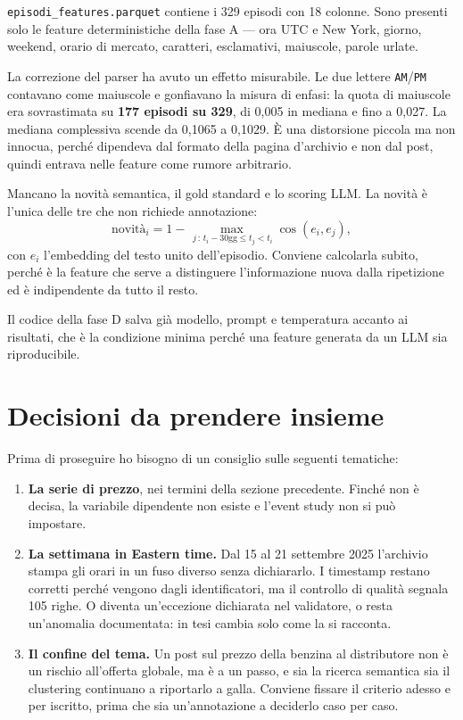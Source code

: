 \documentclass[11pt,a4paper]{article}
\begin{document}
\texttt{episodi\_features.parquet} contiene i 329 episodi con 18 colonne.
Sono presenti solo le feature deterministiche della fase A — ora UTC e New York, giorno, weekend,
orario di mercato, caratteri, esclamativi, maiuscole, parole urlate.

La correzione del parser ha avuto un effetto misurabile. Le due
lettere \texttt{AM}/\texttt{PM} contavano come maiuscole e gonfiavano la
misura di enfasi: la quota di maiuscole era sovrastimata su \textbf{177
episodi su 329}, di 0,005 in mediana e fino a 0,027. La mediana complessiva
scende da 0,1065 a 0,1029. È una distorsione piccola ma non innocua, perché
dipendeva dal formato della pagina d'archivio e non dal post, quindi entrava
nelle feature come rumore arbitrario.

Mancano la novità semantica, il gold standard e lo scoring LLM. La novità è
l'unica delle tre che non richiede annotazione:
\[
  \text{novit\`a}_i = 1 - \max_{\,j\,:\,t_i - 30\text{gg} \le t_j < t_i}
  \cos\!\left(e_i, e_j\right),
\]
con $e_i$ l'embedding del testo unito dell'episodio. Conviene calcolarla
subito, perché è la feature che serve a distinguere l'informazione nuova dalla
ripetizione ed è indipendente da tutto il resto.

Il codice della fase D salva già modello, prompt e temperatura accanto ai
risultati, che è la condizione minima perché una feature generata da un LLM
sia riproducibile.

\section{Decisioni da prendere insieme}

Prima di proseguire ho bisogno di un consiglio sulle seguenti tematiche: 

\begin{enumerate}
  \item \textbf{La serie di prezzo}, nei termini della sezione precedente.
    Finché non è decisa, la variabile dipendente non esiste e l'event study
    non si può impostare.
  \item \textbf{La settimana in Eastern time.} Dal 15 al 21 settembre 2025
    l'archivio stampa gli orari in un fuso diverso senza dichiararlo. I
    timestamp restano corretti perché vengono dagli identificatori, ma il
    controllo di qualità segnala 105 righe. O diventa un'eccezione dichiarata
    nel validatore, o resta un'anomalia documentata: in tesi cambia solo come
    la si racconta.
  \item \textbf{Il confine del tema.} Un post sul prezzo della benzina al
    distributore non è un rischio all'offerta globale, ma è a un passo, e sia
    la ricerca semantica sia il clustering continuano a riportarlo a galla.
    Conviene fissare il criterio adesso e per iscritto, prima che sia
    un'annotazione a deciderlo caso per caso.
\end{enumerate}
\end{document}

